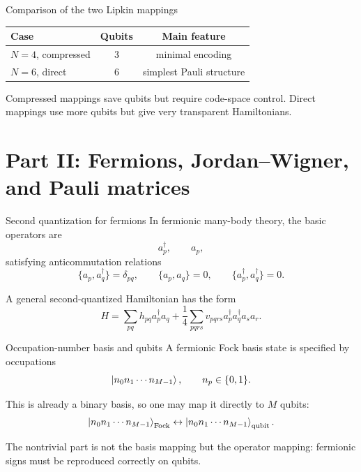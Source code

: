 \documentclass[aspectratio=169]{beamer}
\begin{document}
\begin{frame}{Comparison of the two Lipkin mappings}
\begin{center}
\begin{tabular}{lcc}
\hline
Case & Qubits & Main feature \\
\hline
\(N=4\), compressed & 3 & minimal encoding \\
\(N=6\), direct & 6 & simplest Pauli structure \\
\hline
\end{tabular}
\end{center}

Compressed mappings save qubits but require code-space control.
Direct mappings use more qubits but give very transparent Hamiltonians.
\end{frame}

\section{Part II: Fermions, Jordan--Wigner, and Pauli matrices}

\begin{frame}{Second quantization for fermions}
In fermionic many-body theory, the basic operators are
\[
a_p^\dagger,\qquad a_p,
\]
satisfying anticommutation relations
\[
\{a_p,a_q^\dagger\}=\delta_{pq},
\qquad
\{a_p,a_q\}=0,
\qquad
\{a_p^\dagger,a_q^\dagger\}=0.
\]

A general second-quantized Hamiltonian has the form
\[
H
=
\sum_{pq} h_{pq} a_p^\dagger a_q
+
\frac{1}{4}\sum_{pqrs} v_{pqrs} a_p^\dagger a_q^\dagger a_s a_r.
\]
\end{frame}

\begin{frame}{Occupation-number basis and qubits}
A fermionic Fock basis state is specified by occupations
\[
\ket{n_0 n_1 \cdots n_{M-1}},
\qquad
n_p\in\{0,1\}.
\]

This is already a binary basis, so one may map it directly to \(M\) qubits:
\[
\ket{n_0 n_1 \cdots n_{M-1}}_{\mathrm{Fock}}
\leftrightarrow
\ket{n_0 n_1 \cdots n_{M-1}}_{\mathrm{qubit}}.
\]

The nontrivial part is not the basis mapping but the operator mapping:
fermionic signs must be reproduced correctly on qubits.
\end{frame}
\end{document}
